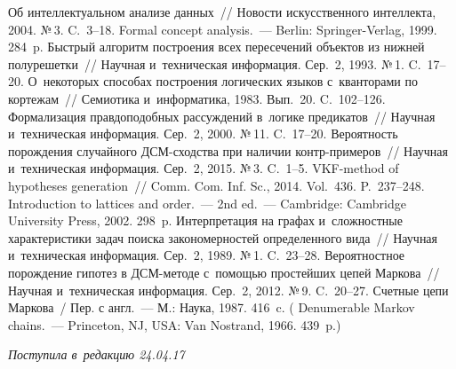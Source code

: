 \begin{multicols}{2}
{\small\frenchspacing
 {%
 \begin{thebibliography}{99}
 Об интеллектуальном анализе данных~// 
Новости искусственного интеллекта, 2004. №\,3. C.~3--18.
 Formal concept analysis.~--- 
Berlin: Springer-Verlag, 1999. 284~p.
Быстрый алгоритм построения всех пересечений объектов из нижней полурешетки~// 
Научная и~техническая информация. Сер.~2, 1993. №\,1. C.~17--20.
О~некоторых способах построения логических языков с~кванторами по кортежам~// 
Се\-мио\-ти\-ка и~информатика, 1983. Вып.~20. C.~102--126.
 Формализация правдоподобных рассуждений в~логике предикатов~// 
Научная и~техническая информация. Сер.~2, 2000. №\,11. C.~17--20.
 Вероятность порождения случайного ДСМ-сход\-ст\-ва 
при наличии контр-при\-ме\-ров~// Научная и~техническая информация. Сер.~2, 2015.
 №\,3. C.~1--5.
 VKF-method of hypotheses generation~// 
Comm. Com. Inf. Sc., 2014. Vol.~436. P.~237--248.
Introduction to lattices and order.~--- 2nd ed.~--- 
Cambridge: Cambridge University Press, 2002. 298~p.
Интерпретация на графах и~сложностные характеристики задач поиска 
закономерностей определенного вида~// Научная и~техническая информация. Сер.~2, 1989. 
№\,1. C.~23--28.
Вероятностное порождение гипотез в ДСМ-ме\-то\-де с~по\-мощью простейших цепей Маркова~// 
Научная и~техническая информация. Сер.~2, 2012. №\,9. C.~20--27.
Счетные цепи Маркова~/ Пер. с англ.~--- М.: Наука, 1987. 416~c.
(
{Denumerable Markov chains}.~--- Princeton, NJ, USA: Van Nostrand,  1966. 439~p.)

 \end{thebibliography}

 }
 }

\end{multicols}

\vspace*{-6pt}

\hfill{\small\textit{Поступила в~редакцию 24.04.17}}

\vspace*{8pt}

